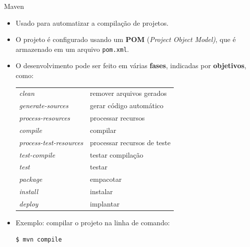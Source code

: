 \documentclass[smaller]{beamer}
\begin{document}
\begin{frame}[fragile]{Maven}
  \begin{itemize}
    \item Usado para automatizar a compilação de projetos.
    \item O projeto é configurado usando um \textbf{POM} (\emph{Project
      Object Model)}, que é armazenado em um arquivo \texttt{pom.xml}.
    \item O desenvolvimento pode ser feito em várias \textbf{fases},
    indicadas por \textbf{objetivos}, como:
    \begin{center}
      \begin{tabular}{ll}
        \textit{clean}                  & remover arquivos gerados    \\
        \textit{generate-sources}       & gerar código automático     \\
        \textit{process-resources}      & processar recursos          \\
        \textit{compile}                & compilar                    \\
        \textit{process-test-resources} & processar recursos de teste \\
        \textit{test-compile}           & testar compilação           \\
        \textit{test}                   & testar                      \\
        \textit{package}                & empacotar                   \\
        \textit{install}                & instalar                    \\
        \textit{deploy}                 & implantar
      \end{tabular}
    \end{center}
    \item Exemplo: compilar o projeto na linha de comando:
\begin{Verbatim}[frame=single]
$ mvn compile
\end{Verbatim}
  \end{itemize}
\end{frame}
\end{document}
